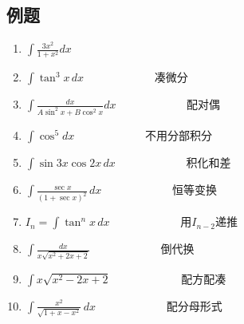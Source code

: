 \subsection{例题}
\begin{enumerate}
	\item $\displaystyle\int \frac{3x^2}{1+x^2}dx$
	\item $\displaystyle\int \tan^3 x\,dx\qquad\qquad\qquad$ 凑微分
	\item $\displaystyle\int \frac{dx}{A\sin^2 x+B\cos^2 x}dx\qquad\qquad\qquad$ 配对偶
	\item $\displaystyle\int \cos^5dx\qquad\qquad\qquad$ 不用分部积分
	\item $\displaystyle\int \sin 3x \cos 2x\,dx\qquad\qquad\qquad$ 积化和差
	\item $\displaystyle\int \frac{\sec x}{(1+\sec x)^2}\,dx\qquad\qquad\qquad$ 恒等变换
	\item $I_n=\displaystyle\int \tan^n x\,dx\qquad\qquad\qquad$ 用$I_{n-2}$递推
	\item $\displaystyle\int \frac{dx}{x\sqrt{x^2+2x+2}}\qquad\qquad\qquad$ 倒代换
	\item $\displaystyle\int x\sqrt{x^2-2x+2}\qquad\qquad\qquad$ 配方配凑
	\item $\displaystyle\int \frac{x^2}{\sqrt{1+x-x^2}}\,dx\qquad\qquad\qquad$ 配分母形式
\end{enumerate}


